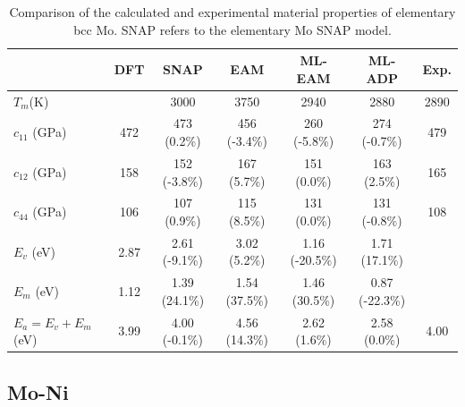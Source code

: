 \documentclass[prb,reprint]{revtex4-2}
\begin{document}
% 
%
\begin{table}[htp]
\centering
\begin{tabular}{lcccccc}
\hline
    & DFT & SNAP & EAM & ML-EAM & ML-ADP & Exp. \\
\hline
$T_{m}$(K) & & 3000 & 3750 & 2940 & 2880 & 2890 \\
$c_{11}$ (GPa) & 472 & 473 (0.2\%) & 456 (-3.4\%) & 260 (-5.8\%) & 274 (-0.7\%) & 479 \\
$c_{12}$ (GPa) & 158 & 152 (-3.8\%) & 167 (5.7\%) & 151 (0.0\%) & 163 (2.5\%) & 165 \\
$c_{44}$ (GPa) & 106 & 107 (0.9\%) & 115 (8.5\%) & 131 (0.0\%) & 131 (-0.8\%) & 108 \\
$E_{v}$ (eV) & 2.87 & 2.61 (-9.1\%) & 3.02 (5.2\%) & 1.16 (-20.5\%) & 1.71 (17.1\%) & \\
$E_{m}$ (eV) & 1.12 & 1.39 (24.1\%) & 1.54 (37.5\%) & 1.46 (30.5\%) & 0.87 (-22.3\%) & \\
$E_{a} = E_{v} + E_{m} $ (eV) & 3.99 & 4.00 (-0.1\%) & 4.56 (14.3\%) & 2.62 (1.6\%) & 2.58 (0.0\%) & 4.00 \\
\hline
\end{tabular}
\caption{\label{table:elementary_Mo} Comparison of the calculated and 
experimental material properties of elementary bcc Mo. SNAP refers to the 
elementary Mo SNAP model.
}
\end{table}

% 
%
\subsection{Mo-Ni}
\label{sec:alloy}
\end{document}
